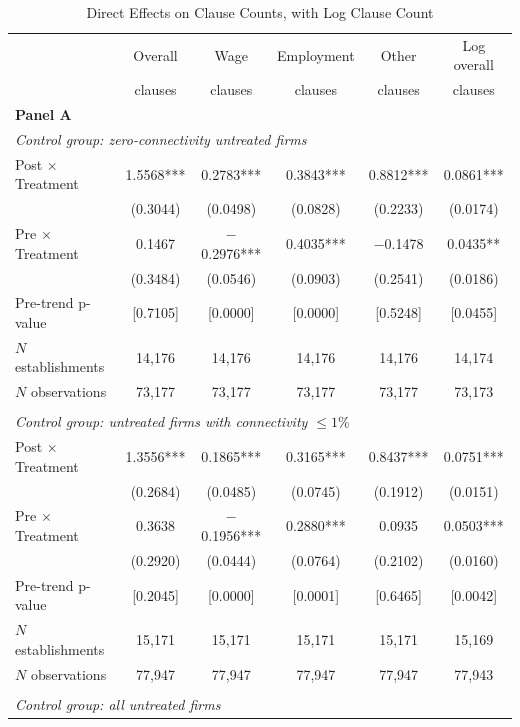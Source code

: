 \begin{table}[!htbp]
\centering
\caption{Direct Effects on Clause Counts, with Log Clause Count}
\label{tab:clause_count_direct_logcol}
\scriptsize
\begin{tabular}{lccccc}
\toprule
 & Overall & Wage & Employment & Other & Log overall \\
 & clauses & clauses & clauses & clauses & clauses \\
\midrule
\multicolumn{6}{l}{\textbf{Panel A}}\\
\multicolumn{6}{l}{\textit{Control group: zero-connectivity untreated firms}}\\
Post $\times$ Treatment & 1.5568*** & 0.2783*** & 0.3843*** & 0.8812*** & 0.0861***\\
 & (0.3044) & (0.0498) & (0.0828) & (0.2233) & (0.0174)\\
Pre $\times$ Treatment & 0.1467 & $-$0.2976*** & 0.4035*** & $-$0.1478 & 0.0435**\\
 & (0.3484) & (0.0546) & (0.0903) & (0.2541) & (0.0186)\\
Pre-trend p-value & [0.7105] & [0.0000] & [0.0000] & [0.5248] & [0.0455]\\
$N$ establishments & 14{,}176 & 14{,}176 & 14{,}176 & 14{,}176 & 14{,}174\\
$N$ observations & 73{,}177 & 73{,}177 & 73{,}177 & 73{,}177 & 73{,}173\\
\addlinespace
\multicolumn{6}{l}{\textbf{Panel B}}\\
\multicolumn{6}{l}{\textit{Control group: untreated firms with connectivity $\leq 1\%$}}\\
Post $\times$ Treatment & 1.3556*** & 0.1865*** & 0.3165*** & 0.8437*** & 0.0751***\\
 & (0.2684) & (0.0485) & (0.0745) & (0.1912) & (0.0151)\\
Pre $\times$ Treatment & 0.3638 & $-$0.1956*** & 0.2880*** & 0.0935 & 0.0503***\\
 & (0.2920) & (0.0444) & (0.0764) & (0.2102) & (0.0160)\\
Pre-trend p-value & [0.2045] & [0.0000] & [0.0001] & [0.6465] & [0.0042]\\
$N$ establishments & 15{,}171 & 15{,}171 & 15{,}171 & 15{,}171 & 15{,}169\\
$N$ observations & 77{,}947 & 77{,}947 & 77{,}947 & 77{,}947 & 77{,}943\\
\addlinespace
\multicolumn{6}{l}{\textbf{Panel C}}\\
\multicolumn{6}{l}{\textit{Control group: all untreated firms}}\\

\end{tabular}
\end{table}
